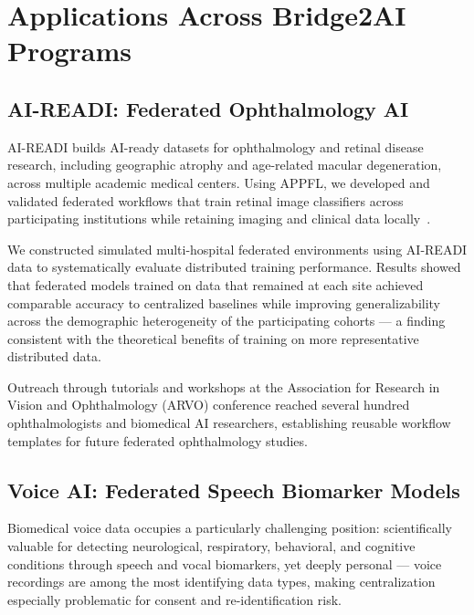 \documentclass[conference]{IEEEtran}
\begin{document}
\section{Applications Across Bridge2AI Programs}

\subsection{AI-READI: Federated Ophthalmology AI}

AI-READI builds AI-ready datasets for ophthalmology and retinal disease research, including geographic atrophy and age-related macular degeneration, across multiple academic medical centers. Using APPFL, we developed and validated federated workflows that train retinal image classifiers across participating institutions while retaining imaging and clinical data locally~\cite{aireadi_arvo}.

We constructed simulated multi-hospital federated environments using AI-READI data to systematically evaluate distributed training performance. Results showed that federated models trained on data that remained at each site achieved comparable accuracy to centralized baselines while improving generalizability across the demographic heterogeneity of the participating cohorts — a finding consistent with the theoretical benefits of training on more representative distributed data.

Outreach through tutorials and workshops at the Association for Research in Vision and Ophthalmology (ARVO) conference reached several hundred ophthalmologists and biomedical AI researchers, establishing reusable workflow templates for future federated ophthalmology studies.

\subsection{Voice AI: Federated Speech Biomarker Models}

Biomedical voice data occupies a particularly challenging position: scientifically valuable for detecting neurological, respiratory, behavioral, and cognitive conditions through speech and vocal biomarkers, yet deeply personal — voice recordings are among the most identifying data types, making centralization especially problematic for consent and re-identification risk.
\end{document}
